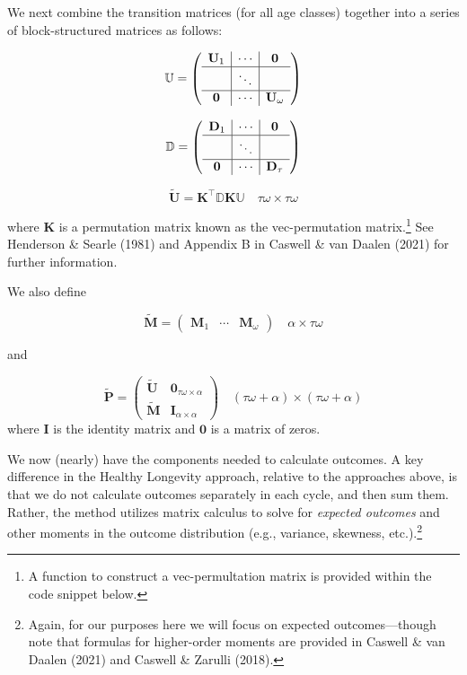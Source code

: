 \documentclass[
]{agujournal2019}
\begin{document}
We next combine the transition matrices (for all age classes) together
into a series of block-structured matrices as follows:

\[
\mathbb{U}=\left(\begin{array}{c|c|c}
\mathbf{U}_1 & \cdots & \mathbf{0} \\
\hline & \ddots & \\
\hline \mathbf{0} & \cdots & \mathbf{U}_\omega
\end{array}\right)
\]

\[
\mathbb{D}=\left(\begin{array}{c|c|c}
\mathbf{D}_1 & \cdots & \mathbf{0} \\
\hline & \ddots & \\
\hline \mathbf{0} & \cdots & \mathbf{D}_\tau
\end{array}\right)
\]

\[
\tilde{\mathbf{U}}=\mathbf{K}^{\top} \mathbb{D} \mathbf{K} \mathbb{U} \quad \tau \omega \times \tau \omega
\]

where \(\mathbf{K}\) is a permutation matrix known as the
vec-permutation matrix.\footnote{A function to construct a
  vec-permultation matrix is provided within the code snippet below.}
See Henderson \& Searle (1981) and Appendix B in Caswell \& van Daalen
(2021) for further information.

We also define

\[
\tilde{\mathbf{M}}=\left(\begin{array}{lll}
\mathbf{M}_1 & \cdots & \mathbf{M}_\omega
\end{array}\right) \quad \alpha \times \tau \omega
\]

and

\[
\tilde{\mathbf{P}}=\left(\begin{array}{c|c}
\tilde{\mathbf{U}} & \mathbf{0}_{\tau \omega \times \alpha} \\
\hline \tilde{\mathbf{M}} & \mathbf{I}_{\alpha \times \alpha}
\end{array}\right) \quad(\tau \omega+\alpha) \times(\tau \omega+\alpha)
\] where \(\mathbf{I}\) is the identity matrix and \(\mathbf{0}\) is a
matrix of zeros.

We now (nearly) have the components needed to calculate outcomes. A key
difference in the Healthy Longevity approach, relative to the approaches
above, is that we do not calculate outcomes separately in each cycle,
and then sum them. Rather, the method utilizes matrix calculus to solve
for \emph{expected outcomes} and other moments in the outcome
distribution (e.g., variance, skewness, etc.).\footnote{Again, for our
  purposes here we will focus on expected outcomes---though note that
  formulas for higher-order moments are provided in Caswell \& van
  Daalen (2021) and Caswell \& Zarulli (2018).}
\end{document}
